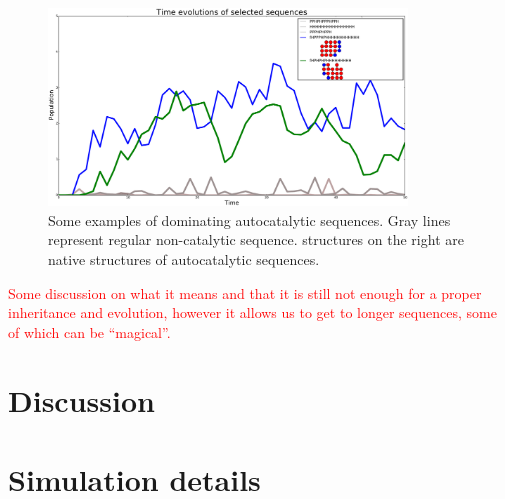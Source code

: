 \documentclass[12pt]{paper}
\newcommand{\red}[1]{\textcolor{red}{#1}}
\begin{document}
\begin{figure}[h!]
  \centering
  \includegraphics[width=0.85\textwidth]{pictures/example1.pdf} 
  \caption{Some examples of dominating autocatalytic sequences. Gray lines represent regular 
non-catalytic sequence. structures on the right are native structures of autocatalytic sequences. }
  \label{fig:example1}
\end{figure}

\red{Some discussion on what it means and that it is still not enough for a proper inheritance and 
evolution, however it allows us to get to longer sequences, some of which can be ``magical''.}

\section{Discussion}


 \newpage
\appendix


\section{Simulation details}



 
  
\end{document}
